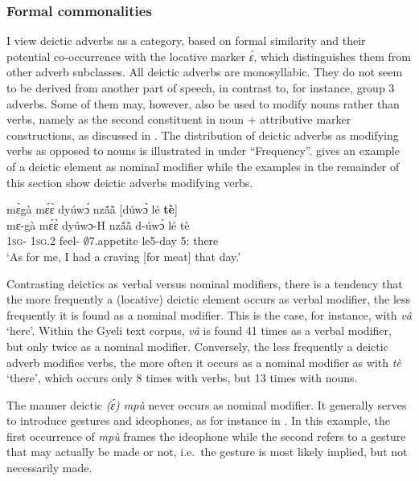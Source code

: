 \subsubsection*{Formal commonalities}

I view deictic adverbs as a category, based on formal similarity and their potential co-occurrence with the locative marker {\itshape ɛ́}, which distinguishes them from other adverb subclasses. 
All deictic adverbs are monosyllabic. They do not seem to be derived from another part of speech, in contrast to, for instance, group 3 adverbs. Some of them may, however, also be used to modify nouns rather than verbs, namely as the second constituent in noun + attributive marker constructions, as discussed in .  The distribution of deictic adverbs as modifying verbs as opposed to nouns is illustrated in  under ``Frequency''.  gives an example of a deictic element as nominal modifier while the examples in the remainder of this section show deictic adverbs modifying verbs.


\ea \label{DeicNom}
  \glll mɛ̀gà mɛ́ɛ̀ dyúwɔ́ nzã́ã̀ [dúwɔ̀ lé {\bfseries tè}] \\
        mɛ-gà mɛ́ɛ̀ dyúwɔ-H nzã́ã̀ {\db}d-úwɔ̀ lé tè \\
         1\textsc{sg}-{\CONTR} 1\textsc{sg}.{\PST}2 feel-{\R} $\emptyset$7.appetite {\db}le5-day 5:{\ATT} there \\
    \trans `As for me, I had a craving [for meat] that day.'
\z

\noindent Contrasting deictics as verbal versus nominal modifiers, there is a tendency that the more frequently a (locative) deictic element occurs as verbal modifier, the less frequently it is found as a nominal modifier. This is the case, for instance, with {\itshape vâ} `here'. Within the Gyeli text corpus, {\itshape vâ} is found 41 times as a verbal modifier, but only twice as a nominal modifier.  Conversely, the less frequently a deictic adverb modifies verbs, the more often it occurs as a nominal modifier as with {\itshape tè} `there', which occurs only 8 times with verbs, but 13 times with nouns. 

%
\iffalse
The manner deictic {\itshape (ɛ́) mpù} never occurs as nominal modifier.  It generally serves to introduce gestures and ideophones, as for instance in . In this example, the first occurrence of {\itshape mpù} frames the ideophone while the second refers to a gesture that may actually be made or not, i.e.\ the gesture is most likely implied, but not necessarily made.


